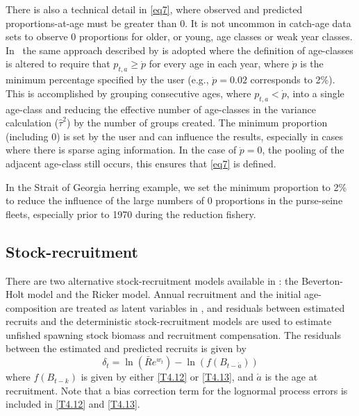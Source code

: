 There is also a technical detail in \eqref{eq7}, where observed and predicted proportions-at-age must be greater than 0.  It is not uncommon in catch-age data sets to observe 0 proportions for older, or young, age classes or weak year classes. In \iscam\ the same approach described by \cite{richards1997visualizing} is adopted where the definition of age-classes is altered to require that $p_{t,a}\geq \dot{p}$ for every age in each year, where $\dot{p}$ is the minimum percentage specified by the user (e.g., $\dot{p}=0.02$ corresponds to 2\%).  This is accomplished by grouping consecutive ages, where $p_{t,a} <\dot{p}$, into a single age-class and reducing the effective number of age-classes in the variance calculation ($\widehat{\tau}^2$) by the number of groups created.  The minimum proportion (including 0) is set by the user and can influence the results, especially in cases where there is sparse aging information.  In the case of $\dot{p}=0$, the pooling of the adjacent age-class still occurs, this ensures that \eqref{eq7} is defined.

In the Strait of Georgia herring example, we set the minimum proportion to 2\% to reduce the influence of the large numbers of 0 proportions in the purse-seine fleets, especially prior to 1970 during the reduction fishery.


\subsection{Stock-recruitment}
There are two alternative stock-recruitment models available in \iscam: the Beverton-Holt model and the Ricker model.  Annual recruitment and the initial age-composition are treated as latent variables in \iscam, and residuals between estimated recruits and the deterministic stock-recruitment models are used to estimate unfished spawning stock biomass and recruitment compensation.  The residuals between the estimated and predicted recruits is given by
\begin{equation}\label{eq9}
	\delta_t = \ln(\bar{R}e^{w_t}) - \ln(f(B_{t-\acute{a}}))
\end{equation}
where $f(B_{t-k})$ is given by either \eqref{T4.12} or \eqref{T4.13}, and $\acute{a}$ is the age at recruitment.  Note that a bias correction term for the lognormal process  errors is included in  \eqref{T4.12} and \eqref{T4.13}.


